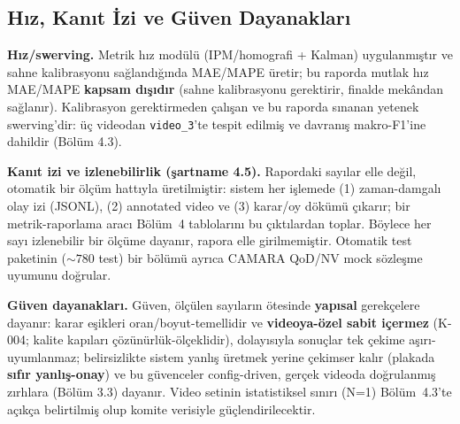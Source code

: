 \documentclass[12pt,a4paper]{article}
\newcommand{\tcode}[1]{\texttt{\small #1}}
\begin{document}
\subsection{Hız, Kanıt İzi ve Güven Dayanakları}
\textbf{Hız/swerving.} Metrik hız modülü (IPM/homografi + Kalman) uygulanmıştır ve sahne kalibrasyonu
sağlandığında MAE/MAPE üretir; bu raporda mutlak hız MAE/MAPE \textbf{kapsam dışıdır} (sahne
kalibrasyonu gerektirir, finalde mekândan sağlanır). Kalibrasyon gerektirmeden çalışan ve bu raporda
sınanan yetenek swerving'dir: üç videodan \tcode{video\_3}'te tespit edilmiş ve davranış makro-F1'ine
dahildir (Bölüm 4.3).

\textbf{Kanıt izi ve izlenebilirlik (şartname 4.5).} Rapordaki sayılar elle değil, otomatik bir
ölçüm hattıyla üretilmiştir: sistem her işlemede (1) zaman-damgalı olay izi (JSONL), (2) annotated
video ve (3) karar/oy dökümü çıkarır; bir metrik-raporlama aracı Bölüm~4 tablolarını bu çıktılardan
toplar. Böylece her sayı izlenebilir bir ölçüme dayanır, rapora elle girilmemiştir. Otomatik test
paketinin (${\sim}780$ test) bir bölümü ayrıca CAMARA QoD/NV mock sözleşme uyumunu doğrular.

\textbf{Güven dayanakları.} Güven, ölçülen sayıların ötesinde \textbf{yapısal} gerekçelere
dayanır: karar eşikleri oran/boyut-temellidir ve \textbf{videoya-özel sabit içermez} (K-004; kalite kapıları çözünürlük-ölçeklidir), dolayısıyla
sonuçlar tek çekime aşırı-uyumlanmaz; belirsizlikte sistem yanlış üretmek yerine çekimser kalır
(plakada \textbf{sıfır yanlış-onay}) ve bu güvenceler config-driven, gerçek videoda doğrulanmış zırhlara
(Bölüm 3.3) dayanır. Video setinin istatistiksel sınırı (N=1) Bölüm~4.3'te açıkça belirtilmiş olup
komite verisiyle güçlendirilecektir.

\end{document}
